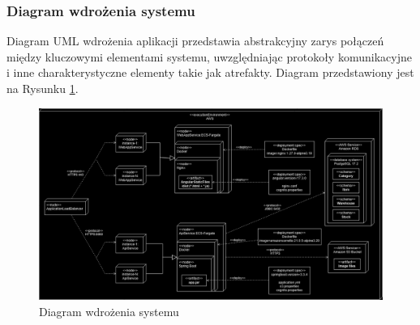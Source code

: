 \documentclass[../main.tex]{subfiles}
\begin{document}
        \subsubsection*{Diagram wdrożenia systemu}
        Diagram UML wdrożenia aplikacji przedstawia abstrakcyjny zarys połączeń między kluczowymi elementami systemu, uwzględniając protokoły komunikacyjne i inne charakterystyczne elementy takie jak atrefakty. Diagram przedstawiony jest na Rysunku \ref{fig:deployment-diagram}.
        \begin{figure}[!ht]
            \centering
            \includegraphics[width=1.0\linewidth]{images/deployment-diagram.png}
            \caption{Diagram wdrożenia systemu}
            \label{fig:deployment-diagram}
        \end{figure}

\end{document}
